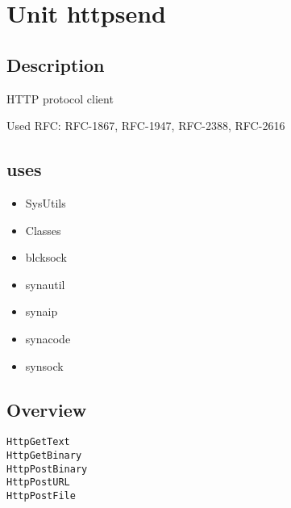 \documentclass{report}
\begin{document}
\chapter{Unit httpsend}
\label{httpsend}
\section{Description}
HTTP protocol client\hfill\vspace*{1ex}



Used RFC: RFC{-}1867, RFC{-}1947, RFC{-}2388, RFC{-}2616
\section{uses}
\begin{itemize}
\item \begin{ttfamily}SysUtils\end{ttfamily}\item \begin{ttfamily}Classes\end{ttfamily}\item \begin{ttfamily}blcksock\end{ttfamily}\item \begin{ttfamily}synautil\end{ttfamily}\item \begin{ttfamily}synaip\end{ttfamily}\item \begin{ttfamily}synacode\end{ttfamily}\item \begin{ttfamily}synsock\end{ttfamily}\end{itemize}
\section{Overview}
\begin{description}
\item[\texttt{\begin{ttfamily}THTTPSend\end{ttfamily} Class}]
\end{description}
\begin{description}
\item[\texttt{HttpGetText}]
\item[\texttt{HttpGetBinary}]
\item[\texttt{HttpPostBinary}]
\item[\texttt{HttpPostURL}]
\item[\texttt{HttpPostFile}]
\end{description}
\end{document}
